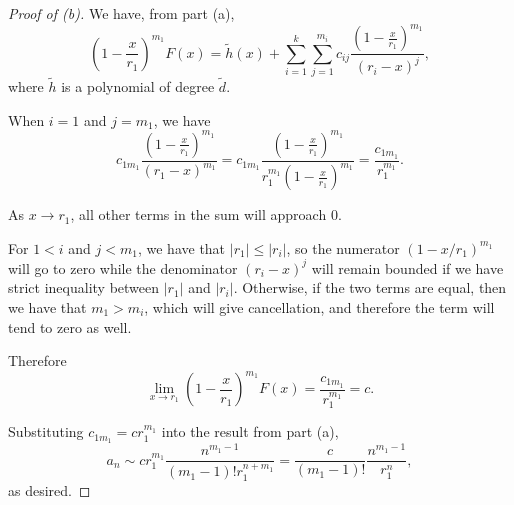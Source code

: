 \documentclass[../hw2]{subfiles}
\begin{document}
\begin{proof}[Proof of (b)]
	We have, from part (a), \[
		\left( 1-\frac{x}{r_1} \right)^{m_1}F(x) = \tilde{h}(x) + \sum_{i=1}^{k}\sum_{j=1}^{m_i}c_{ij}\frac{\left( 1-\frac{x}{r_1} \right)^{m_1}}{(r_i-x)^j}
		,\] where $\tilde{h}$ is a polynomial of degree $\tilde{d}$.

	When $i=1$ and $j=m_1$, we have \[
		c_{1m_1}\frac{\left( 1-\frac{x}{r_1} \right)^{m_1}}{(r_1-x)^{m_1}}=c_{1m_1}\frac{\left( 1-\frac{x}{r_1} \right)^{m_1}}{r_1^{m_1}\left( 1-\frac{x}{r_1} \right)^{m_1}} = \frac{c_{1m_1}}{r_1^{m_1}}
		.\]

	As $x \to r_1$, all other terms in the sum will approach 0.

	For $1 < i$ and $j<m_1$, we have that  $|r_1| \le |r_i|$, so the numerator $(1 - x / r_1)^{m_1}$ will go to zero while the denominator $(r_i-x)^j$ will remain bounded if
	we have strict inequality between  $|r_1|$ and $|r_i|$.
	Otherwise, if the two terms are equal, then we have that $m_1>m_i$, which will give cancellation, and therefore the term will tend to zero as well.


	Therefore \[
		\lim_{x \to r_1} \left( 1-\frac{x}{r_1} \right)^{m_1}F(x) = \frac{c_{1m_1}}{r_1^{m_1}} = c
		.\]

	Substituting $c_{1m_1} = c r_1^{m_1}$ into the result from part (a), \[
		a_n \sim c r_1^{m_1} \frac{n^{m_1-1}}{(m_1-1)!r_1^{n+m_1}} = \frac{c}{(m_1-1)!}\frac{n^{m_1-1}}{r_1^n}
		,\] as desired.
\end{proof}
\end{document}
